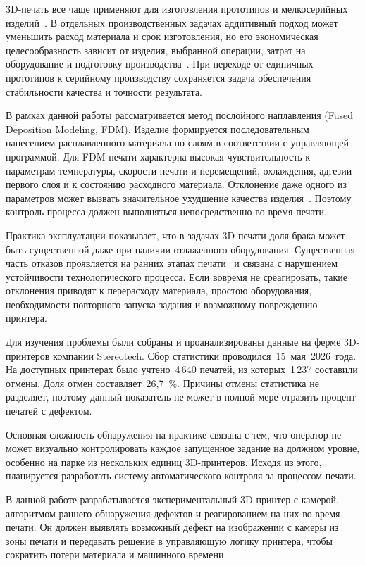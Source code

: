 \intro
3D-печать все чаще применяют для изготовления прототипов и мелкосерийных изделий~\cite{лысыч2014области,шимохин2019экономическое}. В отдельных производственных задачах аддитивный подход может уменьшить расход материала и срок изготовления, но его экономическая целесообразность зависит от изделия, выбранной операции, затрат на оборудование и подготовку производства~\cite{шимохин2019экономическое}. При переходе от единичных прототипов к серийному производству сохраняется задача обеспечения стабильности качества и точности результата.

В рамках данной работы рассматривается метод послойного наплавления (Fused Deposition Modeling, FDM). Изделие формируется последовательным нанесением расплавленного материала по слоям в соответствии с управляющей программой. Для FDM-печати характерна высокая чувствительность к параметрам температуры, скорости печати и перемещений, охлаждения, адгезии первого слоя и к состоянию расходного материала. Отклонение даже одного из параметров может вызвать значительное ухудшение качества изделия~\cite{ерохин2023анализ}. Поэтому контроль процесса должен выполняться непосредственно во время печати.

Практика эксплуатации показывает, что в задачах 3D-печати доля брака может быть существенной даже при наличии отлаженного оборудования. Существенная часть отказов проявляется на ранних этапах печати~\cite{kim2020image} и связана с нарушением устойчивости технологического процесса. Если вовремя не среагировать, такие отклонения приводят к перерасходу материала, простою оборудования, необходимости повторного запуска задания и возможному повреждению принтера.

Для изучения проблемы были собраны и проанализированы данные на ферме 3D-принтеров компании Stereotech. Сбор статистики проводился~15~мая~2026~года. На доступных принтерах было учтено~4\,640 печатей, из которых~1\,237 составили отмены. Доля отмен составляет~26,7~\%. Причины отмены статистика не разделяет, поэтому данный показатель не может в полной мере отразить процент печатей с дефектом.

Основная сложность обнаружения на практике связана с тем, что оператор не может визуально контролировать каждое запущенное задание на должном уровне, особенно на парке из нескольких единиц 3D-принтеров. Исходя из этого, планируется разработать систему автоматического контроля за процессом печати.

В данной работе разрабатывается экспериментальный 3D-принтер с камерой, алгоритмом раннего обнаружения дефектов и реагированием на них во время печати. Он должен выявлять возможный дефект на изображении с камеры из зоны печати и передавать решение в управляющую логику принтера, чтобы сократить потери материала и машинного времени.


